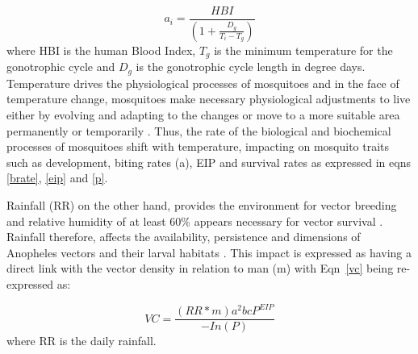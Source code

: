 \documentclass[utf8]{FrontiersinHarvard} %
\begin{document}
\begin{equation}
a_i = \frac{HBI}{(1+\frac{D_g}{T_i-T_g})}
\label{brate}
\end{equation}
where HBI is the human Blood Index, $T_g$ is the minimum temperature for the gonotrophic cycle and $D_g$ is the gonotrophic cycle length in degree days. \\

Temperature drives the physiological processes of mosquitoes and in the face of temperature change, mosquitoes make necessary physiological adjustments to live either by evolving and adapting to the changes or move to a more suitable area permanently or temporarily \citep{buckley2016extreme,villena2022temperature,ryan2023mapping}. Thus, the rate of the biological and biochemical processes of mosquitoes shift with temperature, impacting on mosquito traits such as development, biting rates (a), EIP and survival rates \citep{villena2022temperature,abram2017behavioural} as expressed in eqns \ref{brate}, \ref{eip} and \ref{p}.

Rainfall (RR) on the other hand, provides the environment for vector breeding and relative humidity of at least 60\% appears necessary for vector survival \citep{ermert2011development, tompkins2013regional}. Rainfall therefore, affects the availability, persistence and dimensions of Anopheles vectors and their larval habitats \citep{tompkins2013regional,asare2016breeding}. This impact is expressed as having a direct link with the vector density in relation to man (m) with Eqn~\ref{vc} being re-expressed as: 

\begin{equation}\label{vc2}
	VC  = {\dfrac{(RR*m)a^{2}bcP^{EIP}}{-In(P)}}
\end{equation}
\noindent where RR is the daily rainfall.\\
\end{document}
